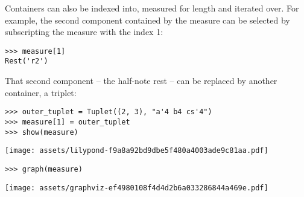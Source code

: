 \noindent Containers can also be indexed into, measured for length and iterated
over. For example, the second component contained by the measure can be
selected by subscripting the measure with the index 1:

\begin{comment}
<abjad>
measure[1]
</abjad>
\end{comment}

\begin{abjadbookoutput}
\begin{singlespacing}
\vspace{-0.5\baselineskip}
\begin{lstlisting}
>>> measure[1]
Rest('r2')
\end{lstlisting}
\end{singlespacing}
\end{abjadbookoutput}

\noindent That second component -- the half-note rest -- can be replaced by
another container, a triplet:

\begin{comment}
<abjad>
outer_tuplet = Tuplet((2, 3), "a'4 b4 cs'4")
measure[1] = outer_tuplet
show(measure)
</abjad>
\end{comment}

\begin{abjadbookoutput}
\begin{singlespacing}
\vspace{-0.5\baselineskip}
\begin{lstlisting}
>>> outer_tuplet = Tuplet((2, 3), "a'4 b4 cs'4")
>>> measure[1] = outer_tuplet
>>> show(measure)
\end{lstlisting}
\noindent\texttt{[image: assets/lilypond-f9a8a92bd9dbe5f480a4003ade9c81aa.pdf]}
\end{singlespacing}
\end{abjadbookoutput}

\begin{comment}
<abjad>
graph(measure)
</abjad>
\end{comment}

\begin{abjadbookoutput}
\begin{singlespacing}
\vspace{-0.5\baselineskip}
\begin{lstlisting}
>>> graph(measure)
\end{lstlisting}
\noindent\texttt{[image: assets/graphviz-ef4980108f4d4d2b6a033286844a469e.pdf]}
\end{singlespacing}
\end{abjadbookoutput}


